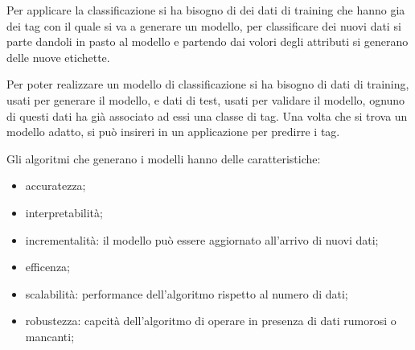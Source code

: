 \documentclass[12pt]{article}
\begin{document}
Per applicare la classificazione si ha bisogno di dei dati di training che hanno gia dei tag con il quale si va a generare un modello, per classificare dei nuovi dati si parte dandoli in pasto al modello e partendo dai volori degli attributi si generano delle nuove etichette.

Per poter realizzare un modello di classificazione si ha bisogno di dati di training, usati per generare il modello, e dati di test, usati per validare il modello, ognuno di questi dati ha gi\`a associato ad essi una classe di tag. Una volta che si trova un modello adatto, si pu\`o insireri in un applicazione per predirre i tag.

Gli algoritmi che generano i modelli hanno delle caratteristiche:
\begin{itemize}
    \item accuratezza;
    \item interpretabilit\`a;
    \item incrementalit\`a: il modello pu\`o essere aggiornato all'arrivo di nuovi dati;
    \item efficenza;
    \item scalabilit\`a: performance dell'algoritmo rispetto al numero di dati;
    \item robustezza: capcit\`a dell'algoritmo di operare in presenza di dati rumorosi o mancanti;
\end{itemize}
\end{document}
